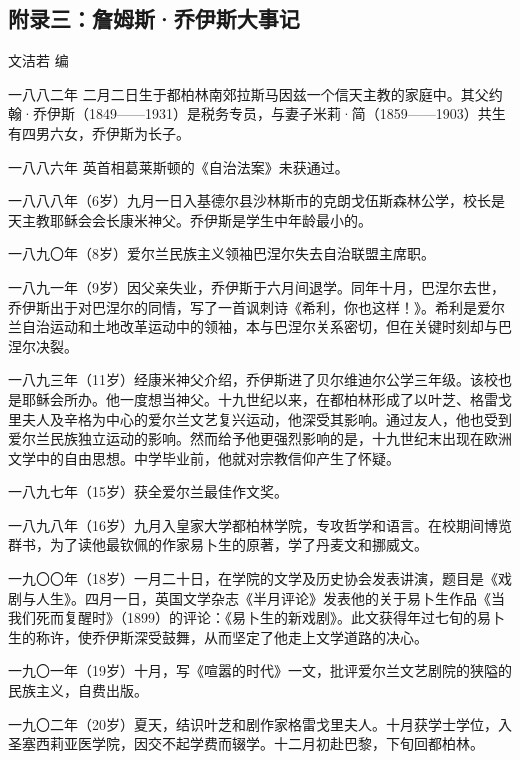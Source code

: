 \subsection*{附录三：詹姆斯·乔伊斯大事记}

\begin{center}
    \par 文洁若 编
\end{center}

\par 一八八二年 二月二日生于都柏林南郊拉斯马因兹一个信天主教的家庭中。其父约翰·乔伊斯（1849——1931）是税务专员，与妻子米莉·简（1859——1903）共生有四男六女，乔伊斯为长子。
\par 一八八六年 英首相葛莱斯顿的《自治法案》未获通过。
\par 一八八八年（6岁）九月一日入基德尔县沙林斯市的克朗戈伍斯森林公学，校长是天主教耶稣会会长康米神父。乔伊斯是学生中年龄最小的。
\par 一八九〇年（8岁）爱尔兰民族主义领袖巴涅尔失去自治联盟主席职。
\par 一八九一年（9岁）因父亲失业，乔伊斯于六月间退学。同年十月，巴涅尔去世，乔伊斯出于对巴涅尔的同情，写了一首讽刺诗《希利，你也这样！》。希利是爱尔兰自治运动和土地改革运动中的领袖，本与巴涅尔关系密切，但在关键时刻却与巴涅尔决裂。
\par 一八九三年（11岁）经康米神父介绍，乔伊斯进了贝尔维迪尔公学三年级。该校也是耶稣会所办。他一度想当神父。十九世纪以来，在都柏林形成了以叶芝、格雷戈里夫人及辛格为中心的爱尔兰文艺复兴运动，他深受其影响。通过友人，他也受到爱尔兰民族独立运动的影响。然而给予他更强烈影响的是，十九世纪末出现在欧洲文学中的自由思想。中学毕业前，他就对宗教信仰产生了怀疑。
\par 一八九七年（15岁）获全爱尔兰最佳作文奖。
\par 一八九八年（16岁）九月入皇家大学都柏林学院，专攻哲学和语言。在校期间博览群书，为了读他最钦佩的作家易卜生的原著，学了丹麦文和挪威文。
\par 一九〇〇年（18岁）一月二十日，在学院的文学及历史协会发表讲演，题目是《戏剧与人生》。四月一日，英国文学杂志《半月评论》发表他的关于易卜生作品《当我们死而复醒时》（1899）的评论：《易卜生的新戏剧》。此文获得年过七旬的易卜生的称许，使乔伊斯深受鼓舞，从而坚定了他走上文学道路的决心。
\par 一九〇一年（19岁）十月，写《喧嚣的时代》一文，批评爱尔兰文艺剧院的狭隘的民族主义，自费出版。
\par 一九〇二年（20岁）夏天，结识叶芝和剧作家格雷戈里夫人。十月获学士学位，入圣塞西莉亚医学院，因交不起学费而辍学。十二月初赴巴黎，下旬回都柏林。
